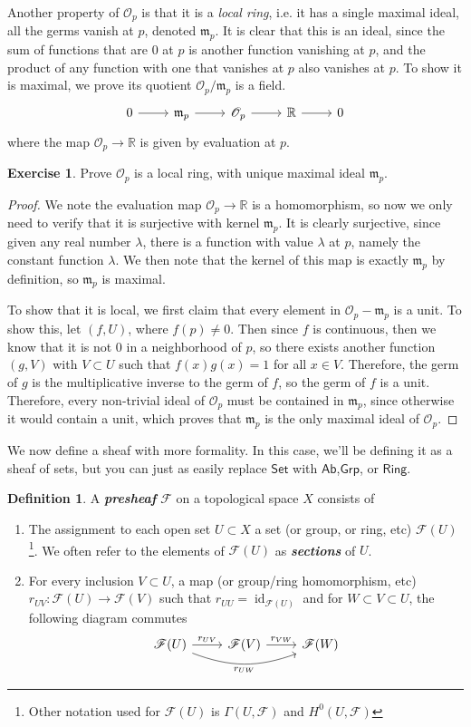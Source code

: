 \documentclass[psamsfonts]{amsart}
\theoremstyle{definition}
\newtheorem{defn}[thm]{Definition}
\newtheorem{exer}[thm]{Exercise}
\theoremstyle{remark}
\renewcommand{\O}{\mathscr{O}}
\newcommand{\R}{\mathbb{R}}
\newcommand{\ib}[1]{\textbf{\textit{#1}}}
\DeclareMathOperator{\id}{id}
\begin{document}
Another property of $\O_p$ is that it is a \emph{local ring}, i.e. it has a single maximal ideal, all the germs vanish at $p$, denoted $\mathfrak{m}_p$. It is clear that this is an ideal, since the sum of functions that are $0$ at $p$ is another function vanishing at $p$, and the product of any function with one that vanishes at $p$ also vanishes at $p$. To show it is maximal, we prove its quotient $\O_p / \mathfrak{m}_p$ is a field.
$$\begin{tikzcd}
0 \ar[r] & \mathfrak{m}_p \ar[r] & \O_p \ar[r] & \R \ar[r] & 0
\end{tikzcd}$$
where the map $\O_p \to \R$ is given by evaluation at $p$.
\begin{exer}
Prove $\O_p$ is a local ring, with unique maximal ideal $\mathfrak{m}_p$.
\end{exer}
%
\begin{proof}
We note the evaluation map $\O_p \to \R$ is a homomorphism, so now we only need to verify that it is surjective with kernel $\mathfrak{m}_p$. It is clearly surjective, since given any real number $\lambda$, there is a function with value $\lambda$ at $p$, namely the constant function $\lambda$. We then note that the kernel of this map is exactly $\mathfrak{m}_p$ by definition, so $\mathfrak{m}_p$ is maximal.

To show that it is local, we first claim that every element in $\O_p - \mathfrak{m}_p$ is a unit. To show this, let $(f,U)$, where $f(p) \neq 0$.  Then since $f$ is continuous, then we know that it is not $0$ in a neighborhood of $p$, so there exists another function $(g,V)$ with $V \subset U$ such that $f(x)g(x) = 1$ for all $x \in V$. Therefore, the germ of $g$ is the multiplicative inverse to the germ of $f$, so the germ of $f$ is a unit. Therefore, every non-trivial ideal of $\O_p$ must be contained in $\mathfrak{m}_p$, since otherwise it would contain a unit, which proves that $\mathfrak{m}_p$ is the only maximal ideal of $\O_p$.
\end{proof}
%
We now define a sheaf with more formality. In this case, we'll be defining it as a sheaf of sets, but you can just as easily replace $\mathsf{Set}$ with $\mathsf{Ab}$,$\mathsf{Grp}$, or $\mathsf{Ring}$.
%
\begin{defn}
A \ib{presheaf} $\mathscr{F}$  on a topological space $X$ consists of 
\begin{enumerate}
\item The assignment to each open set $U \subset X$ a set (or group, or ring, etc) $\mathscr{F}(U)$\footnote{Other notation used for $\mathscr{F}(U)$ is $\Gamma(U,\mathscr{F})$ and $H^0(U,\mathscr{F})$}. We often refer to the elements of $\mathscr{F}(U)$ as \ib{sections} of $U$.
\item For every inclusion $V \subset U$, a map (or group/ring homomorphism, etc) $r_{UV} : \mathscr{F}(U) \to \mathscr{F}(V)$ such that $r_{UU} = \id_{\mathscr{F}(U)}$ and for $W \subset V \subset U$, the following diagram commutes
$$\begin{tikzcd}
\mathscr{F}(U) \ar[r, "r_{UV}"] \ar[rr, bend right=20, "r_{UW}"'] & \mathscr{F}(V) \ar[r, "r_{VW}"]& \mathscr{F}(W)
\end{tikzcd}$$
\end{enumerate}
\end{defn}
\end{document}
